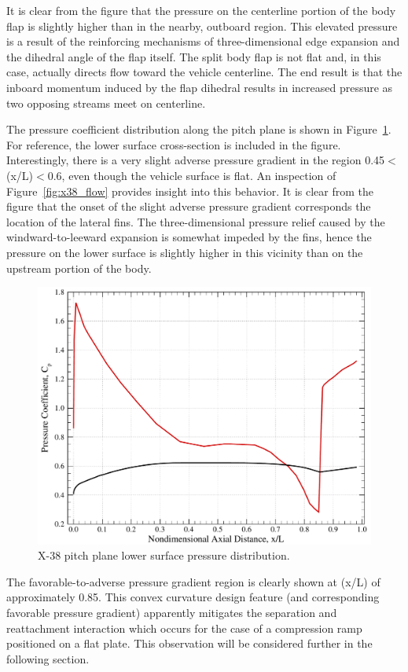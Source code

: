 It is clear from the figure that the pressure on the centerline portion of the body flap is slightly higher than in the nearby, outboard region.  This elevated pressure is a result of the reinforcing mechanisms of three-dimensional edge expansion and the dihedral angle of the flap itself.  The split body flap is not flat and, in this case, actually directs flow toward the vehicle centerline.  The end result is that the inboard momentum induced by the flap dihedral results in increased pressure as two opposing streams meet on centerline.  

The pressure coefficient distribution along the pitch plane is shown in Figure~\ref{fig:x38_pitch_plane_cp}. For reference, the lower surface cross-section is included in the figure.  Interestingly, there is a very slight adverse pressure gradient in the region 0.45$<$(x/L)$<$0.6, even though the vehicle surface is flat. An inspection of Figure~\ref{fig:x38_flow} provides insight into this behavior.  It is clear from the figure that the onset of the slight adverse pressure gradient corresponds the location of the lateral fins.  The three-dimensional pressure relief caused by the windward-to-leeward expansion is somewhat impeded by the fins, hence the pressure on the lower surface is slightly higher in this vicinity than on the upstream portion of the body.

\clearpage
\begin{figure}[hbtp]
  \begin{center}
    \includegraphics[width=\textwidth]{figures/x38/Cp_a40}
    \caption{X-38 pitch plane lower surface pressure distribution.\label{fig:x38_pitch_plane_cp}}
  \end{center}
\end{figure}
The favorable-to-adverse pressure gradient region is clearly shown at (x/L) of approximately 0.85.  This convex curvature design feature (and corresponding favorable pressure gradient) apparently mitigates the separation and reattachment interaction which occurs for the case of a compression ramp positioned on a flat plate. This observation will be considered further in the following section.


